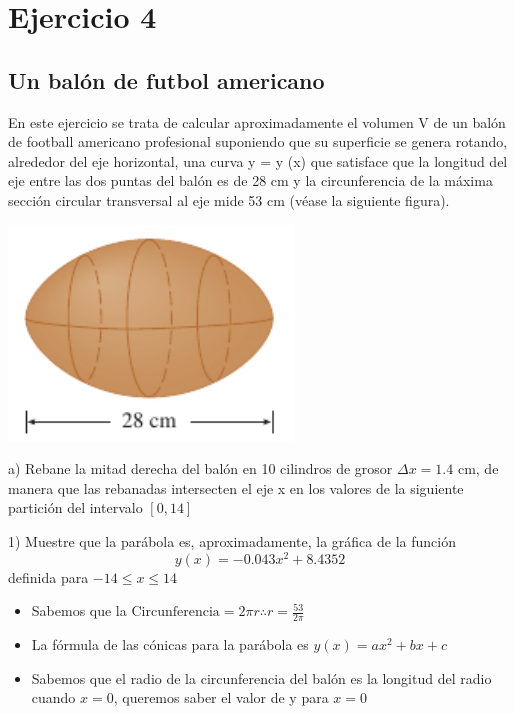 \chapter*{Ejercicio 4}
\section*{Un balón de futbol americano}
En este ejercicio se trata de calcular aproximadamente el volumen V de un balón
de football americano profesional suponiendo que su superficie se genera rotando,
alrededor del eje horizontal, una curva y = y (x) que satisface que la longitud del eje
entre las dos puntas del balón es de 28 cm y la circunferencia de la máxima sección
circular transversal al eje mide 53 cm (véase la siguiente figura).

\begin{center}
    \includegraphics[height = 0.2\textheight]{recursos/Captura desde 2024-08-29 18-44-04.png}\par
\end{center}


a) Rebane la mitad derecha del balón en 10 cilindros de grosor $\Delta x = 1.4$ cm, de manera
que las rebanadas intersecten el eje x en los valores de la siguiente partición del intervalo
$[0, 14]$ 

1) Muestre que la parábola es, aproximadamente, la gráfica de la función
    $$y(x)=-0.043x^2 + 8.4352$$
definida para $-14\leq x\leq 14$


\begin{itemize}
    \item Sabemos que la $\text{Circunferencia}=2\pi r \therefore r=\frac{53}{2\pi}$
    \item La fórmula de las cónicas para la parábola es $y(x)=ax{^2}+bx+c$
    \item Sabemos que el radio de la circunferencia del balón es la longitud del radio cuando $x=0$, queremos saber el valor de y para $x=0$
\end{itemize}

